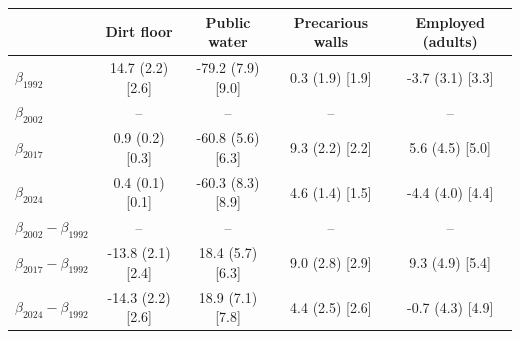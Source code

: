 \begin{tabular}{lcccc}
\toprule
 & Dirt floor & Public water & Precarious walls & Employed (adults) \\
\midrule
$\beta_{1992}$ & 14.7 (2.2) [2.6] & -79.2 (7.9) [9.0] & 0.3 (1.9) [1.9] & -3.7 (3.1) [3.3] \\
$\beta_{2002}$ & -- & -- & -- & -- \\
$\beta_{2017}$ & 0.9 (0.2) [0.3] & -60.8 (5.6) [6.3] & 9.3 (2.2) [2.2] & 5.6 (4.5) [5.0] \\
$\beta_{2024}$ & 0.4 (0.1) [0.1] & -60.3 (8.3) [8.9] & 4.6 (1.4) [1.5] & -4.4 (4.0) [4.4] \\
\midrule
$\beta_{2002}-\beta_{1992}$ & -- & -- & -- & -- \\
$\beta_{2017}-\beta_{1992}$ & -13.8 (2.1) [2.4] & 18.4 (5.7) [6.3] & 9.0 (2.8) [2.9] & 9.3 (4.9) [5.4] \\
$\beta_{2024}-\beta_{1992}$ & -14.3 (2.2) [2.6] & 18.9 (7.1) [7.8] & 4.4 (2.5) [2.6] & -0.7 (4.3) [4.9] \\
\bottomrule
\end{tabular}

